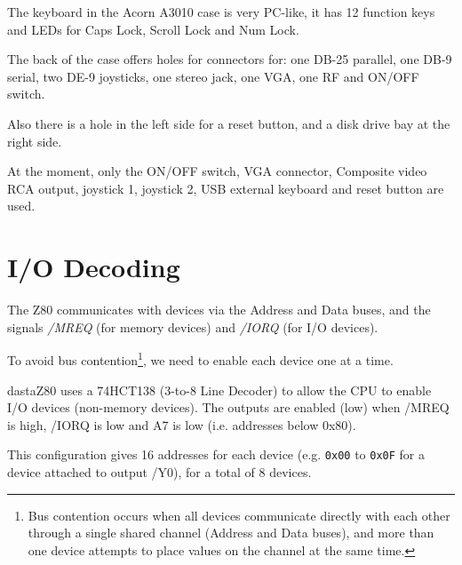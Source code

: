 \documentclass[a4paper,11pt]{article}
\begin{document}
    The keyboard in the Acorn A3010 case is very PC-like, it has 12 function
    keys and LEDs for Caps Lock, Scroll Lock and Num Lock.

    The back of the case offers holes for connectors for: one DB-25 parallel, 
    one DB-9 serial, two DE-9 joysticks, one stereo jack, one VGA, one RF and
    ON/OFF switch.

    Also there is a hole in the left side for a reset button, and a disk drive
    bay at the right side.

    At the moment, only the ON/OFF switch, VGA connector, Composite video RCA
    output, joystick 1, joystick 2, USB external keyboard and reset button are
    used.

    \pagebreak
    \section{I/O Decoding}

    The Z80 communicates with devices via the Address and Data buses, and the
    signals \textit{/MREQ} (for memory devices) and \textit{/IORQ} (for I/O
    devices).

    To avoid bus contention\footnote{Bus contention occurs when all devices
    communicate directly with each other through a single shared channel
    (Address and Data buses), and more than one device attempts to place values
    on the channel at the same time.}, we need to enable each device one at a
    time.

    dastaZ80 uses a 74HCT138 (3-to-8 Line Decoder) to allow the CPU to enable
    I/O devices (non-memory devices). The outputs are enabled (low) when /MREQ
    is high, /IORQ is low and A7 is low (i.e. addresses below 0x80).
    
    This configuration gives 16 addresses for each device (e.g. \texttt{0x00} to
    \texttt{0x0F} for a device attached to output /Y0), for a total of 8 devices.
\end{document}

